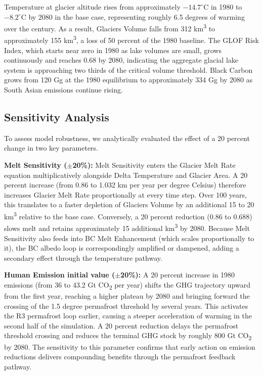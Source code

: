 \documentclass[12pt, a4paper]{article}
\begin{document}
Temperature at glacier altitude rises from approximately $-14.7^\circ$C in 1980 to $-8.2^\circ$C by 2080 in the base case, representing roughly 6.5 degrees of warming over the century. As a result, Glaciers Volume falls from 312 km\textsuperscript{3} to approximately 155 km\textsuperscript{3}, a loss of 50 percent of the 1980 baseline. The GLOF Risk Index, which starts near zero in 1980 as lake volumes are small, grows continuously and reaches 0.68 by 2080, indicating the aggregate glacial lake system is approaching two thirds of the critical volume threshold. Black Carbon grows from 120 Gg at the 1980 equilibrium to approximately 334 Gg by 2080 as South Asian emissions continue rising.

\subsection{Sensitivity Analysis}

To assess model robustness, we analytically evaluated the effect of a 20 percent change in two key parameters.

\textbf{Melt Sensitivity ($\pm$20\%):} Melt Sensitivity enters the Glacier Melt Rate equation multiplicatively alongside Delta Temperature and Glacier Area. A 20 percent increase (from 0.86 to 1.032 km per year per degree Celsius) therefore increases Glacier Melt Rate proportionally at every time step. Over 100 years, this translates to a faster depletion of Glaciers Volume by an additional 15 to 20 km\textsuperscript{3} relative to the base case. Conversely, a 20 percent reduction (0.86 to 0.688) slows melt and retains approximately 15 additional km\textsuperscript{3} by 2080. Because Melt Sensitivity also feeds into BC Melt Enhancement (which scales proportionally to it), the BC albedo loop is correspondingly amplified or dampened, adding a secondary effect through the temperature pathway.

\textbf{Human Emission initial value ($\pm$20\%):} A 20 percent increase in 1980 emissions (from 36 to 43.2 Gt CO\textsubscript{2} per year) shifts the GHG trajectory upward from the first year, reaching a higher plateau by 2080 and bringing forward the crossing of the 1.5 degree permafrost threshold by several years. This activates the R3 permafrost loop earlier, causing a steeper acceleration of warming in the second half of the simulation. A 20 percent reduction delays the permafrost threshold crossing and reduces the terminal GHG stock by roughly 800 Gt CO\textsubscript{2} by 2080. The sensitivity to this parameter confirms that early action on emission reductions delivers compounding benefits through the permafrost feedback pathway.
\end{document}
